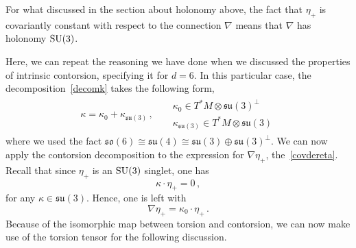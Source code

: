 \documentclass[debug]{phd}
\begin{document}
				For what discussed in the section about holonomy above, the fact that $\eta_+$ is covariantly constant with respect to the connection $\nabla$ means that $\nabla$ has holonomy $\mathrm{SU}(3)$.
				
				Here, we can repeat the reasoning we have done when we discussed the properties of intrinsic contorsion, specifying it for $d=6$.
				In this particular case, the decomposition~\eqref{decomk} takes the following form,
						\begin{align}
							&&	\kappa = \kappa_0 + \kappa_{\mathfrak{su}(3)}\, , & & 	\begin{array}{l}
																				\kappa_0 			\in T^*M \otimes \mathfrak{su}(3)^\perp \\[1mm]
																				\kappa_{\mathfrak{su}(3)} \in T^*M \otimes \mathfrak{su}(3)
																			\end{array}	&&
						\end{align}
				where we used the fact $\mathfrak{so}(6) \cong \mathfrak{su}(4) \cong \mathfrak{su}(3) \oplus \mathfrak{su}(3)^\perp$.
				We can now apply the contorsion decomposition to the expression for $\nabla \eta_+$, the~\eqref{covdereta}.
				Recall that since $\eta_+$ is an $\mathrm{SU}(3)$ singlet, one has
						\begin{equation}
							\kappa \cdot \eta_+ = 0\, ,
						\end{equation}
				for any $\kappa \in \mathfrak{su}(3)$.
				Hence, one is left with
						\begin{equation}\label{conteta}
							\nabla  \eta_+ = \kappa_0 \cdot \eta_+\, .
						\end{equation}
				Because of the isomorphic map between torsion and contorsion, we can now make use of the torsion tensor for the following discussion.
\end{document}
